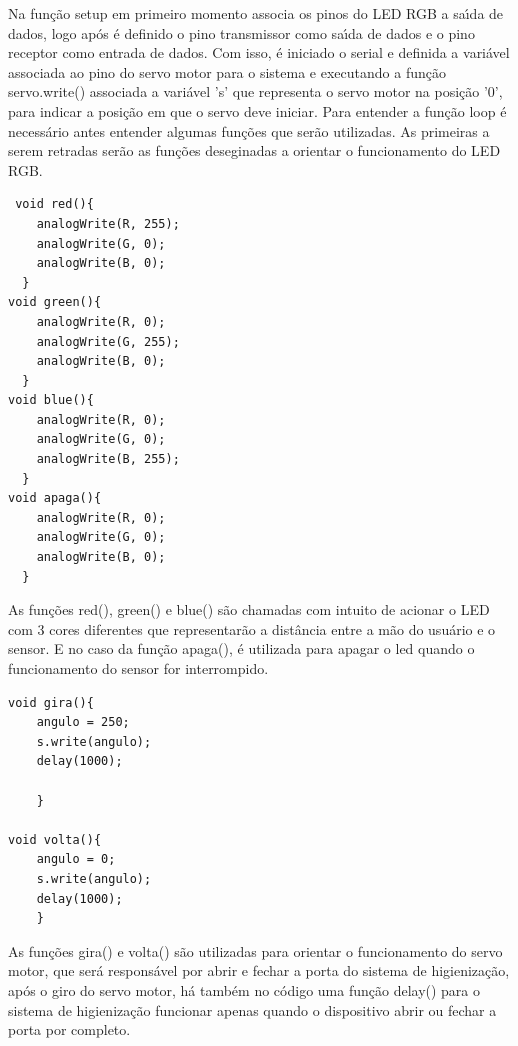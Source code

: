 \documentclass[conference]{IEEEtran}
\begin{document}
        Na função setup em primeiro momento associa os pinos
        do LED RGB a saı́da de dados, logo após é definido o pino
        transmissor como saı́da de dados e o pino receptor como
        entrada de dados. Com isso, é iniciado o serial e definida
        a variável associada ao pino do servo motor para o
        sistema e executando a função servo.write() associada a variável 's' que representa o servo motor na posição '0', para
        indicar a posição em que o servo deve iniciar. Para entender
        a função loop é necessário antes entender algumas funções
        que serão utilizadas. As primeiras a serem retradas serão as
        funções deseginadas a orientar o funcionamento do LED RGB.

        \begin{lstlisting}
 void red(){
    analogWrite(R, 255);
    analogWrite(G, 0);
    analogWrite(B, 0);
  }
void green(){
    analogWrite(R, 0);
    analogWrite(G, 255);
    analogWrite(B, 0);
  }  
void blue(){
    analogWrite(R, 0);
    analogWrite(G, 0);
    analogWrite(B, 255);
  }  
void apaga(){
    analogWrite(R, 0);
    analogWrite(G, 0);
    analogWrite(B, 0);
  } 
        \end{lstlisting}
        As funções red(), green() e blue() são chamadas com intuito de acionar o LED com 3 cores diferentes que representarão a distância entre a mão do usuário e o sensor.
        E no caso da função apaga(), é utilizada para apagar o led quando o funcionamento do sensor for interrompido.
        \begin{lstlisting}
void gira(){
    angulo = 250;
    s.write(angulo); 
    delay(1000);
   
 	}

void volta(){
    angulo = 0;
    s.write(angulo); 
    delay(1000);
 	}
        \end{lstlisting}
        As funções gira() e volta() são utilizadas para orientar o
        funcionamento do servo motor, que será responsável por abrir e fechar a porta do sistema de higienização, após o giro do
        servo motor, há também no código uma função delay() para o
        sistema de higienização funcionar apenas quando o dispositivo
        abrir ou fechar a porta por completo.
\end{document}

